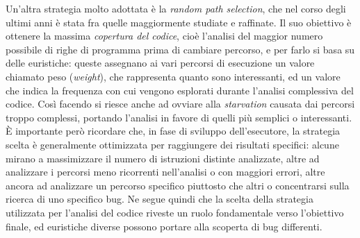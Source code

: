 \documentclass[Lau, oneside]{sapthesis}%
\begin{document}
Un'altra strategia molto adottata è la \textit{random path selection}, che nel corso degli ultimi anni è stata fra quelle maggiormente studiate e raffinate.
\newline
Il suo obiettivo è ottenere la massima \textit{copertura del codice}, cioè l'analisi del maggior numero possibile di righe di programma prima di cambiare percorso, e per farlo si basa su delle euristiche: queste assegnano ai vari percorsi di esecuzione un valore chiamato peso (\textit{weight}), che rappresenta quanto sono interessanti, ed un valore che indica la frequenza con cui vengono esplorati durante l'analisi complessiva del codice.
\newline
Così facendo si riesce anche ad ovviare alla \textit{starvation} causata dai percorsi troppo complessi, portando l'analisi in favore di quelli più semplici o interessanti.
\newline \newline
È importante però ricordare che, in fase di sviluppo dell'esecutore, la strategia scelta è generalmente ottimizzata per raggiungere dei risultati specifici: alcune mirano a massimizzare il numero di istruzioni distinte analizzate, altre ad analizzare i percorsi meno ricorrenti nell'analisi o con maggiori errori, altre ancora ad analizzare un percorso specifico piuttosto che altri o concentrarsi sulla ricerca di uno specifico bug.
\newline \newline
Ne segue quindi che la scelta della strategia utilizzata per l'analisi del codice riveste un ruolo fondamentale verso l'obiettivo finale, ed euristiche diverse possono portare alla scoperta di bug differenti.
\end{document}
